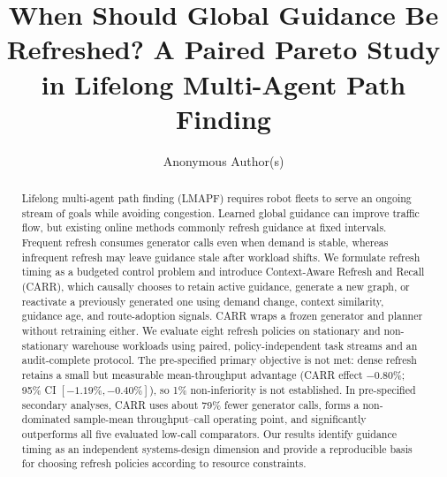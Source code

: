 \documentclass[sigconf,review,anonymous]{acmart}
\newcommand{\carr}{\textsc{CARR}\xspace}
\begin{document}
\title[When Should Global Guidance Be Refreshed?]
  {When Should Global Guidance Be Refreshed? A Paired Pareto Study in Lifelong Multi-Agent Path Finding}

\author{Anonymous Author(s)}
\renewcommand{\shortauthors}{Anonymous Author(s)}

\begin{abstract}
Lifelong multi-agent path finding (LMAPF) requires robot fleets to serve an
ongoing stream of goals while avoiding congestion. Learned global guidance can
improve traffic flow, but existing online methods commonly refresh guidance at
fixed intervals. Frequent refresh consumes generator calls even when demand is
stable, whereas infrequent refresh may leave guidance stale after workload
shifts. We formulate refresh timing as a budgeted control problem and
introduce Context-Aware Refresh and Recall (\carr), which causally chooses to
retain active guidance, generate a new graph, or reactivate a previously
generated one using demand change, context similarity, guidance age, and
route-adoption signals. \carr wraps a frozen generator and planner without
retraining either. We evaluate eight refresh policies on stationary and
non-stationary warehouse workloads using
paired, policy-independent task streams and an audit-complete protocol.
The pre-specified primary objective is not met: dense refresh retains a small
but measurable mean-throughput advantage (\carr effect $-0.80\%$; 95\% CI
$[-1.19\%,-0.40\%]$), so 1\% non-inferiority is not established. In
pre-specified secondary analyses, \carr uses about 79\% fewer generator calls,
forms a non-dominated sample-mean throughput--call operating point, and
significantly outperforms all five evaluated low-call comparators. Our results
identify guidance timing as an independent systems-design dimension and
provide a reproducible basis for choosing refresh policies according to
resource constraints.
\end{abstract}



\maketitle
\end{document}
